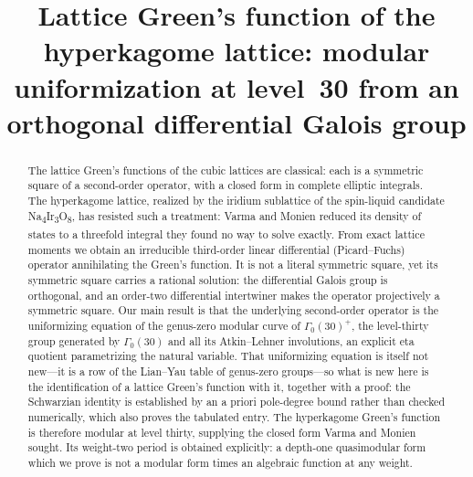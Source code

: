 \documentclass[cntp]{ipart}
\theoremstyle{plain}
\theoremstyle{remark}
\begin{document}
\begin{frontmatter}

\title[Lattice Green's function of the hyperkagome lattice]{Lattice Green's function of the
hyperkagome lattice: modular uniformization at level~30 from an orthogonal differential
Galois group}


\begin{abstract}
The lattice Green's functions of the cubic lattices are classical: each is a symmetric square of a
second-order operator, with a closed form in complete elliptic integrals. The hyperkagome lattice,
realized by the iridium sublattice of the spin-liquid candidate
Na\textsubscript{4}Ir\textsubscript{3}O\textsubscript{8}, has resisted such
a treatment: Varma and Monien reduced its density of states to a threefold integral they found no way
to solve exactly. From exact lattice moments we obtain an irreducible third-order linear differential
(Picard--Fuchs) operator annihilating the Green's function. It is not a literal symmetric square, yet its symmetric
square carries a rational solution: the differential Galois group is orthogonal, and an order-two
differential intertwiner makes the operator projectively a symmetric square. Our main result is that the
underlying second-order operator is the uniformizing equation of the genus-zero modular curve of
$\Gamma_0(30)^+$, the level-thirty group generated by $\Gamma_0(30)$ and all its Atkin--Lehner
involutions, an explicit eta quotient parametrizing the natural variable. That uniformizing
equation is itself not new---it is a row of the Lian--Yau table of genus-zero groups---so what is
new here is the identification of a lattice Green's function with it, together with a proof: the
Schwarzian identity is established by an a priori pole-degree bound rather than checked
numerically, which also proves the tabulated entry. The hyperkagome Green's function is therefore
modular at level thirty, supplying the closed form Varma and Monien sought. Its weight-two period
is obtained explicitly: a depth-one quasimodular form which we prove is not a modular form times
an algebraic function at any weight.
\end{abstract}


\end{frontmatter}
\end{document}
